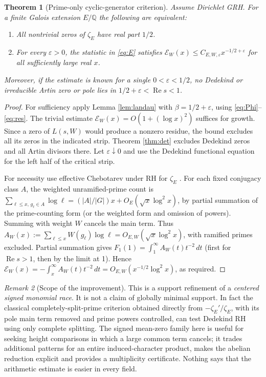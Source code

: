 \documentclass[11pt]{article}
\newtheorem{theorem}{Theorem}[section]
\theoremstyle{remark}\newtheorem{remark}[theorem]{Remark}
\DeclareMathOperator{\Ree}{Re}
\newcommand{\Q}{\mathbb Q}
\newcommand{\eps}{\varepsilon}
\begin{document}
\begin{theorem}[Prime-only cyclic-generator criterion]\label{thm:criterion}
Assume Dirichlet GRH. For a finite Galois extension $E/\Q$ the
following are equivalent:
\begin{enumerate}
\item All nontrivial zeros of $\zeta_E$ have real part $1/2$.
\item For every $\eps>0$, the statistic in \eqref{eq:E} satisfies
$\mathcal E_W(x)\le C_{E,W,\eps}x^{-1/2+\eps}$ for all sufficiently
large real $x$.
\end{enumerate}
Moreover, if the estimate is known for a single $0<\eps<1/2$, no
Dedekind or irreducible Artin zero or pole lies in
$1/2+\eps<\Ree s<1$.
\end{theorem}
\begin{proof}
For sufficiency apply Lemma \ref{lem:landau} with $\beta=1/2+\eps$,
using \eqref{eq:Phi}--\eqref{eq:res}. The trivial estimate
$\mathcal E_W(x)=O(1+(\log x)^2)$ suffices for growth. Since a zero
of $L(s,W)$ would produce a nonzero residue, the bound excludes all
its zeros in the indicated strip. Theorem \ref{thm:det} excludes
Dedekind zeros and all Artin divisors there. Let $\eps\downarrow0$
and use the Dedekind functional equation for the left half of the
critical strip.

For necessity use effective Chebotarev under RH for $\zeta_E$
\cite{lo,gm}. For each fixed conjugacy class $A$, the weighted
unramified-prime count is
$\sum_{\ell\le x,\,g_\ell\in A}\log\ell
=(|A|/|G|)x+O_E(\sqrt{x}\log^2 x)$, by partial summation of the
prime-counting form (or the weighted form and omission of powers).
Summing with weight $W$ cancels the main term. Thus
$A_W(x):=\sum_{\ell\le x} W(g_\ell)\log\ell
=O_{E,W}(\sqrt{x}\log^2 x)$, with ramified primes excluded. Partial
summation gives $F_1(1)=\int_1^\infty A_W(t)t^{-2}\,dt$ (first for
$\Ree s>1$, then by the limit at 1). Hence
$\mathcal E_W(x)=-\int_x^\infty A_W(t)t^{-2}\,dt
=O_{E,W}(x^{-1/2}\log^2 x)$, as required.
\end{proof}

\begin{remark}[Scope of the improvement]
This is a support refinement of a \emph{centered signed monomial
race}. It is not a claim of globally minimal support. In fact the
classical completely-split-prime criterion obtained directly from
$-\zeta_E'/\zeta_E$, with its pole main term removed and prime powers
controlled, can test Dedekind RH using only complete splitting. The
signed mean-zero family here is useful for seeking height comparisons
in which a large common term cancels; it trades additional patterns
for an entire induced-character product, makes the abelian reduction
explicit and provides a multiplicity certificate. Nothing says that
the arithmetic estimate is easier in every field.
\end{remark}
\end{document}
